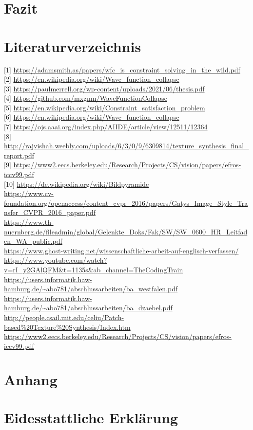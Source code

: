 \documentclass[12pt]{report}
\begin{document}
{\let\clearpage\relax\chapter{Fazit}}

{\let\clearpage\relax\chapter{Literaturverzeichnis}}
{[1]} \url{https://adamsmith.as/papers/wfc_is_constraint_solving_in_the_wild.pdf}\\
{[2]} \url{https://en.wikipedia.org/wiki/Wave_function_collapse}\\
{[3]} \url{https://paulmerrell.org/wp-content/uploads/2021/06/thesis.pdf}\\
{[4]} \url{https://github.com/mxgmn/WaveFunctionCollapse}\\
{[5]} \url{https://en.wikipedia.org/wiki/Constraint_satisfaction_problem}\\
{[6]} \url{https://en.wikipedia.org/wiki/Wave_function_collapse}\\
{[7]} \url{https://ojs.aaai.org/index.php/AIIDE/article/view/12511/12364}\\
{[8]} \url{http://rajvishah.weebly.com/uploads/6/3/0/9/6309814/texture_synthesis_final_report.pdf}\\
{[9]} \url{https://www2.eecs.berkeley.edu/Research/Projects/CS/vision/papers/efros-iccv99.pdf}\\
{[10]} \url{https://de.wikipedia.org/wiki/Bildpyramide}\\
\url{https://www.cv-foundation.org/openaccess/content_cvpr_2016/papers/Gatys_Image_Style_Transfer_CVPR_2016_paper.pdf}\\
\url{https://www.th-nuernberg.de/fileadmin/global/Gelenkte_Doks/Fak/SW/SW_0600_HR_Leitfaden_WA_public.pdf}\\
\url{https://www.ghost-writing.net/wissenschaftliche-arbeit-auf-englisch-verfassen/}\\
\url{https://www.youtube.com/watch?v=rI_y2GAlQFM&t=1135s&ab_channel=TheCodingTrain}\\
\url{https://users.informatik.haw-hamburg.de/~abo781/abschlussarbeiten/ba_westfalen.pdf}\\
\url{https://users.informatik.haw-hamburg.de/~abo781/abschlussarbeiten/ba_dzaebel.pdf}\\
\url{http://people.csail.mit.edu/celiu/Patch-based%20Texture%20Synthesis/Index.htm}\\
\url{https://www2.eecs.berkeley.edu/Research/Projects/CS/vision/papers/efros-iccv99.pdf}\\


{\let\clearpage\relax\chapter{Anhang}}
{\let\clearpage\relax\chapter{Eidesstattliche Erklärung}}
\end{document}
